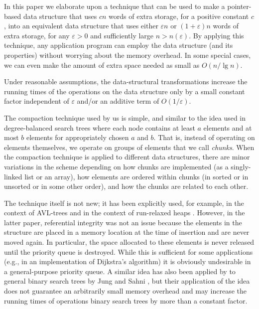 \documentclass{DIKU-article}
\newcommand{\comment}[1]{}
\begin{document}
In this paper we elaborate upon a technique that can be used to make a
pointer-based data structure that uses $cn$ words of extra storage,
for a positive constant $c$, into an equivalent data structure that
uses either $\varepsilon n$ or $(1 + \varepsilon) n$ words of extra
storage, for any $\varepsilon>0$ and sufficiently large $n >
n(\varepsilon)$.  By applying this technique, any application program
can employ the data structure (and its properties) without worrying
about the memory overhead. In some special cases, we can even make the
amount of extra space needed as small as $O(n/\lg n)$.%
\comment{Observe that here the extra space means words plus elements.}
Under reasonable assumptions, the data-structural transformations
increase the running times of the operations on the data structure only by a
small constant factor independent of $\varepsilon$ and/or an additive
term of $O(1/\varepsilon)$.

The compaction technique used by us is simple, and similar to the idea
used in degree-balanced search trees \cite{hm82} where each node
contains at least $a$ elements and at most $b$ elements for
appropriately chosen $a$ and $b$. That is, instead of operating on
elements themselves, we operate on groups of elements that we call
\emph{chunks}.%
\comment{Each chunk has a \emph{representative} and the
underlying data structure operates on these representatives. The
elements in a chunk determine an \emph{interval} of values.} When the
compaction technique is applied to different data structures, there
are minor variations in the scheme depending on how chunks are
implemented (as a singly-linked list or an array), how elements are
ordered within chunks (in sorted or in unsorted or in some other
order), and how the chunks are related to each other.

The technique itself is not new; it has been explicitly used, for
example, in the context of AVL-trees \cite{Mun86} and in the context
of run-relaxed heaps \cite{DGST88}.  However, in the latter paper,
referential integrity was not an issue because the elements in the
structure are placed in a memory location at the time of insertion and
are never moved again.  In particular, the space allocated to these
elements is never released until the priority queue is destroyed.
While this is sufficient for some applications (e.g., in an
implementation of Dijkstra's algorithm) it is obviously undesirable in
a general-purpose priority queue.  A similar idea has also been
applied by to general binary search trees by Jung and Sahni
\cite{js03}, but their application of the idea does not guarantee an
arbitrarily small memory overhead and may increase the running times
of operations binary search trees by more than a constant factor.
\end{document}
